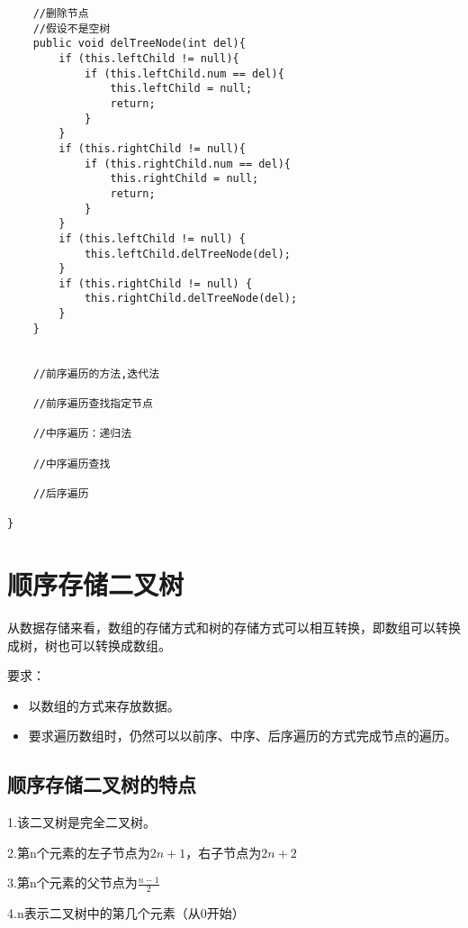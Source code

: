 \documentclass[a4paper]{report}
\begin{document}
\begin{lstlisting}
    //删除节点
    //假设不是空树
    public void delTreeNode(int del){
        if (this.leftChild != null){
            if (this.leftChild.num == del){
                this.leftChild = null;
                return;
            }
        }
        if (this.rightChild != null){
            if (this.rightChild.num == del){
                this.rightChild = null;
                return;
            }
        }
        if (this.leftChild != null) {
            this.leftChild.delTreeNode(del);
        }
        if (this.rightChild != null) {
            this.rightChild.delTreeNode(del);
        }
    }


    //前序遍历的方法,迭代法

    //前序遍历查找指定节点

    //中序遍历：递归法

    //中序遍历查找

    //后序遍历

}
\end{lstlisting}
\section{顺序存储二叉树}
从数据存储来看，数组的存储方式和树的存储方式可以相互转换，即数组可以转换成树，树也可以转换成数组。

要求：

\begin{itemize}
\item 以数组的方式来存放数据。
\item 要求遍历数组时，仍然可以以前序、中序、后序遍历的方式完成节点的遍历。
\end{itemize}
\subsection{顺序存储二叉树的特点}
1.该二叉树是完全二叉树。

2.第n个元素的左子节点为$2n+1$，右子节点为$2n + 2$

3.第n个元素的父节点为$\frac{n - 1}{2}$

4.n表示二叉树中的第几个元素（从0开始）
\end{document}

